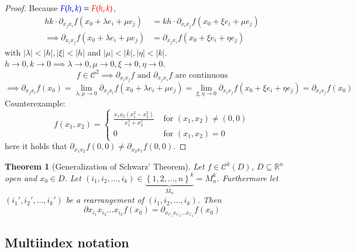 \documentclass{article}
\newtheorem{theorem}{Theorem}  \numberwithin{theorem}{section}
\newcommand{\set}[1]{\left\{#1\right\}}
\newcommand{\card}[1]{\left|#1\right|}
\begin{document}
\begin{proof}
  Because ${\color{blue} F(h, k)} = {\color{red} F(h, k)}$,
  \begin{align*}
    hk \cdot \partial_{x_j x_i} f(x_0 + \lambda e_i + \mu e_j) &= kh \cdot \partial_{x_i x_j} f(x_0 + \xi e_i + \mu e_j) \\
    \implies \partial_{x_i x_j} f(x_0 + \lambda e_i + \mu e_j) &= \partial_{x_j x_i} f(x_0 + \xi e_i + \eta e_j)
  \end{align*}
  with $\card{\lambda} < \card{h}, \card{\xi} < \card{h}$ and $\card{\mu} < \card{k}, \card{\eta} < \card{k}$.
  $h \to 0, k \to 0 \implies \lambda \to 0, \mu \to 0, \xi \to 0, \eta \to 0$.
  \[ f \in \mathcal C^2 \implies \partial_{x_i x_j} f \text{ and } \partial_{x_j x_i} f \text{ are continuous} \]
  \[
    \implies \partial_{x_j x_i} f(x_0) = \lim_{\lambda, \mu \to 0} \partial_{x_j x_i} f(x_0 + \lambda e_i + \mu e_j)
    = \lim_{\xi,\eta \to 0} \partial_{x_i x_j} f(x_0 + \xi e_i + \eta e_j) = \partial_{x_i x_j} f(x_0)
  \]
  Counterexample:
  \[
    f(x_1, x_2) = \begin{cases}
      \frac{x_1 x_2 (x_1^2 - x_2^2)}{x_1^2 + x_2^2} & \text{ for } (x_1, x_2) \neq (0, 0) \\
      0 & \text{ for } (x_1, x_2) = 0
    \end{cases}
  \]
  here it holds that $\partial_{x_1 x_2} f(0, 0) \neq \partial_{x_2 x_1} f(0, 0)$.
\end{proof}

\begin{theorem}[Generalization of Schwarz' Theorem]
  Let $f \in \mathcal C^k(D)$, $D \subseteq \mathbb R^n$ open and $x_0 \in D$.
  Let $(i_1, i_2, \dots, i_k) \in \underbrace{\set{1,2, \dots, n}^k}_{M_n} = M_n^k$.
  Furthermore let $(i_1', i_2', \dots, i_k')$ be a rearrangement of $(i_1, i_2, \dots, i_k)$.
  Then
  \[ \partial{x_{i_1} x_{i_2} \dots x_{i_k}} f(x_0) = \partial_{x_{i'_1} x_{i'_2} \dots x_{i'_k}} f(x_0) \]
\end{theorem}

\subsection{Multiindex notation}
\end{document}
